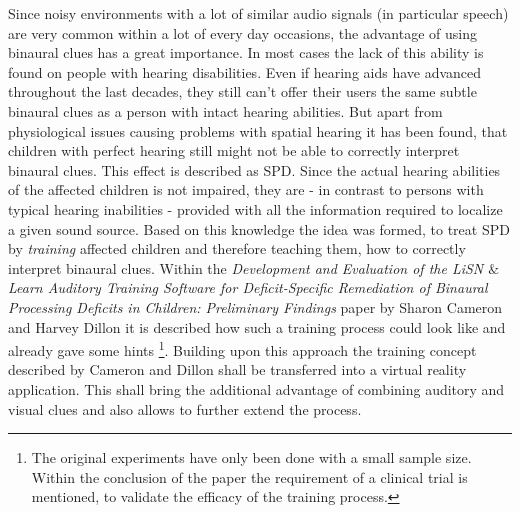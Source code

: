 \documentclass[a4paper,11pt]{article}%
\renewcommand{\\}{\vspace*{0.5\baselineskip} \newline}
\begin{document}
\newline
\newline
Since noisy environments with a lot of similar audio signals (in particular speech) are very common within a lot of every day occasions, the advantage of using binaural clues has a great importance. In most cases the lack of this ability is found on people with hearing disabilities. Even if hearing aids have advanced throughout the last decades, they still can't offer their users the same subtle binaural clues as a person with intact hearing abilities.
\newline
\newline
But apart from physiological issues causing problems with spatial hearing it has been found, that children with perfect hearing still might not be able to correctly interpret binaural clues. This effect is described as \ac{SPD}. Since the actual hearing abilities of the affected children is not impaired, they are - in contrast to persons with typical hearing inabilities - provided with all the information required to localize a given sound source. Based on this knowledge the idea was formed, to treat SPD by \textit{training} affected children and therefore teaching them, how to correctly interpret binaural clues.
\newline
\newline
Within the \textit{Development and Evaluation of the LiSN $\&$ Learn Auditory Training Software for Deficit-Specific Remediation of Binaural Processing Deficits in Children: Preliminary Findings} \cite{LISN-A} paper by Sharon Cameron and Harvey Dillon it is described how such a training process could look like and already gave some hints \footnote{The original experiments have only been done with a small sample size. Within the conclusion of the paper the requirement of a clinical trial is mentioned, to validate the efficacy of the training process.}.
\newline
\newline
Building upon this approach the training concept described by Cameron and Dillon shall be transferred into a virtual reality application. This shall bring the additional advantage of combining auditory and visual clues and also allows to further extend the process. 
\end{document}
